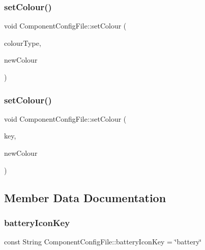 \subsubsection{\texorpdfstring{set\+Colour()}{setColour()}\hspace{0.1cm}{\footnotesize\ttfamily [1/2]}}
{\footnotesize\ttfamily void Component\+Config\+File\+::set\+Colour (\begin{DoxyParamCaption}\item[{\mbox{\hyperlink{classComponentConfigFile_a9bf86058d7f64d6ba94770c3dbf3cad8}{Default\+Colour}}}]{colour\+Type,  }\item[{Colour}]{new\+Colour }\end{DoxyParamCaption})}

\mbox{\label{classComponentConfigFile_afa051342de6ce64f115df2528b48663b}} 
\subsubsection{\texorpdfstring{set\+Colour()}{setColour()}\hspace{0.1cm}{\footnotesize\ttfamily [2/2]}}
{\footnotesize\ttfamily void Component\+Config\+File\+::set\+Colour (\begin{DoxyParamCaption}\item[{String}]{key,  }\item[{Colour}]{new\+Colour }\end{DoxyParamCaption})}



\subsection{Member Data Documentation}
\mbox{\label{classComponentConfigFile_a613804a43d6243563a55a22dd161db43}} 
\subsubsection{\texorpdfstring{battery\+Icon\+Key}{batteryIconKey}}
{\footnotesize\ttfamily const String Component\+Config\+File\+::battery\+Icon\+Key = \char`\"{}battery\char`\"{}\hspace{0.3cm}{\ttfamily [static]}}

